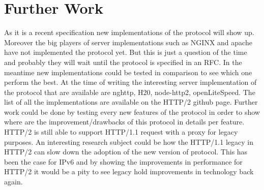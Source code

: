 \section{Further Work}
\label{furtherwork}

As it is a recent specification new implementations of the protocol will show up. Moreover the big players of server implementations such as NGINX\cite{nginx} and apache \cite{apache2} have not implemented the protocol yet. But this is just a question of the time and probably they will wait until the protocol is specified in an RFC. In the meantime new implementations could be tested in comparison to see which one perform the best. At the time of writing the interesting server implementation of the protocol that are available are nghttp, H20, node-http2, openLiteSpeed. The list of all the implementations are available on the HTTP/2 github page.\cite{http2-imp}
Further work could be done by testing every new features of the protocol in order to show where are the improvement/drawbacks of this protocol in details per feature. 
HTTP/2 is still able to support HTTP/1.1 request with a proxy for legacy purposes. An interesting research subject could be how the  HTTP/1.1 legacy in HTTP/2 can slow down the adoption of the new version of protocol. This has been the case for IPv6 and by showing the improvements in performance for HTTP/2 it would be a pity to see legacy hold improvements in technology back again.